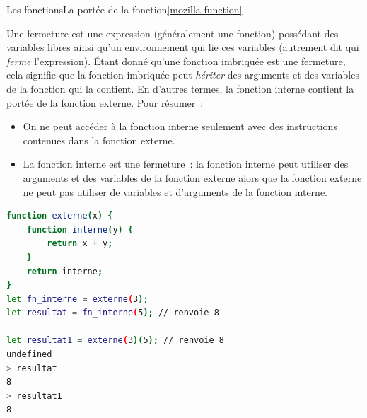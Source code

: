 \documentclass{beamer}
\begin{document}
    \begin{frame}[fragile]{Les fonctions}{La portée de la fonction\cref{mozilla-function}}
        \begin{tiny}
            Une fermeture est une expression (généralement une fonction) possédant des variables libres ainsi qu'un environnement qui lie ces variables (autrement dit qui \textit{ferme} l'expression).
            \bigbreak
            Étant donné qu'une fonction imbriquée est une fermeture, cela signifie que la fonction imbriquée peut \textit{hériter} des arguments et des variables de la fonction qui la contient.
            En d'autres termes, la fonction interne contient la portée de la fonction externe.
            \bigbreak
            Pour résumer~:
            \begin{itemize}
                \item On ne peut accéder à la fonction interne seulement avec des instructions
                contenues dans la fonction externe.
                \item La fonction interne est une fermeture~: la fonction interne peut utiliser des
                arguments et des variables de la fonction externe alors que la fonction externe
                ne peut pas utiliser de variables et d'arguments de la fonction interne.
            \end{itemize}
        \end{tiny}
        \begin{lstlisting}[language=Bash,title={\tiny{Node.js}}]
function externe(x) {
    function interne(y) {
        return x + y;
    }
    return interne;
}
let fn_interne = externe(3);
let resultat = fn_interne(5); // renvoie 8

let resultat1 = externe(3)(5); // renvoie 8
undefined
> resultat
8
> resultat1
8
        \end{lstlisting}
    \end{frame}
\end{document}
